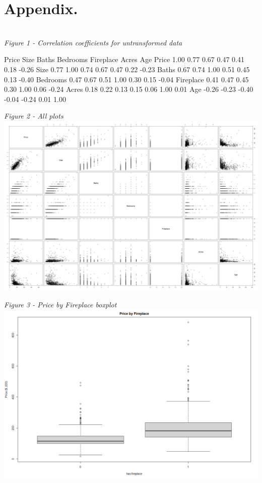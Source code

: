 \documentclass[10pt,A4,makeidx]{article}
\begin{document}
\pagebreak
\section*{Appendix.}
  \emph{\\Figure 1 - Correlation coefficients for untransformed data}
  \begin{Soutput}
              Price  Size Baths Bedrooms Fireplace Acres   Age
    Price      1.00  0.77  0.67     0.47      0.41  0.18 -0.26
    Size       0.77  1.00  0.74     0.67      0.47  0.22 -0.23
    Baths      0.67  0.74  1.00     0.51      0.45  0.13 -0.40
    Bedrooms   0.47  0.67  0.51     1.00      0.30  0.15 -0.04
    Fireplace  0.41  0.47  0.45     0.30      1.00  0.06 -0.24
    Acres      0.18  0.22  0.13     0.15      0.06  1.00  0.01
    Age       -0.26 -0.23 -0.40    -0.04     -0.24  0.01  1.00
  \end{Soutput}
  
  \emph{Figure 2 - All plots}\\
  \includegraphics[scale=2]{plot.png}
  
  \emph{Figure 3 - Price by Fireplace boxplot}\\
  \includegraphics[scale=0.4]{price-fireplace.png}
  
\end{document}
